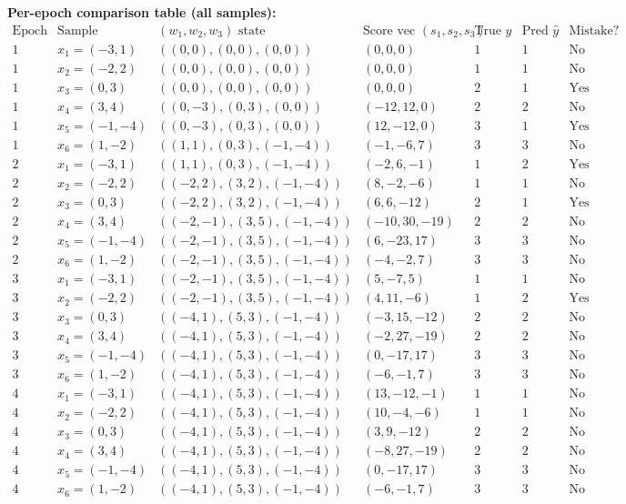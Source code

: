 \documentclass[fleqn]{article}
\begin{document}
    \medskip
    \noindent\textbf{Per-epoch comparison table (all samples):}
    \[
    \begin{array}{c|c|c|c|c|c|c}
        \text{Epoch} & \text{Sample} & (w_1,w_2,w_3)\text{ state} & \text{Score vec }(s_1,s_2,s_3) & \text{True } y & \text{Pred } \hat y & \text{Mistake?}\\
        \hline
        1 & x_1=(-3,1) & ((0,0),(0,0),(0,0)) & (0,0,0) & 1 & 1 & \text{No}\\
        1 & x_2=(-2,2) & ((0,0),(0,0),(0,0)) & (0,0,0) & 1 & 1 & \text{No}\\
        1 & x_3=(0,3) & ((0,0),(0,0),(0,0)) & (0,0,0) & 2 & 1 & \text{Yes}\\
        1 & x_4=(3,4) & ((0,-3),(0,3),(0,0)) & (-12,12,0) & 2 & 2 & \text{No}\\
        1 & x_5=(-1,-4) & ((0,-3),(0,3),(0,0)) & (12,-12,0) & 3 & 1 & \text{Yes}\\
        1 & x_6=(1,-2) & ((1,1),(0,3),(-1,-4)) & (-1,-6,7) & 3 & 3 & \text{No}\\
        \hline
        2 & x_1=(-3,1) & ((1,1),(0,3),(-1,-4)) & (-2,6,-1) & 1 & 2 & \text{Yes}\\
        2 & x_2=(-2,2) & ((-2,2),(3,2),(-1,-4)) & (8,-2,-6) & 1 & 1 & \text{No}\\
        2 & x_3=(0,3) & ((-2,2),(3,2),(-1,-4)) & (6,6,-12) & 2 & 1 & \text{Yes}\\
        2 & x_4=(3,4) & ((-2,-1),(3,5),(-1,-4)) & (-10,30,-19) & 2 & 2 & \text{No}\\
        2 & x_5=(-1,-4) & ((-2,-1),(3,5),(-1,-4)) & (6,-23,17) & 3 & 3 & \text{No}\\
        2 & x_6=(1,-2) & ((-2,-1),(3,5),(-1,-4)) & (-4,-2,7) & 3 & 3 & \text{No}\\
        \hline
        3 & x_1=(-3,1) & ((-2,-1),(3,5),(-1,-4)) & (5,-7,5) & 1 & 1 & \text{No}\\
        3 & x_2=(-2,2) & ((-2,-1),(3,5),(-1,-4)) & (4,11,-6) & 1 & 2 & \text{Yes}\\
        3 & x_3=(0,3) & ((-4,1),(5,3),(-1,-4)) & (-3,15,-12) & 2 & 2 & \text{No}\\
        3 & x_4=(3,4) & ((-4,1),(5,3),(-1,-4)) & (-2,27,-19) & 2 & 2 & \text{No}\\
        3 & x_5=(-1,-4) & ((-4,1),(5,3),(-1,-4)) & (0,-17,17) & 3 & 3 & \text{No}\\
        3 & x_6=(1,-2) & ((-4,1),(5,3),(-1,-4)) & (-6,-1,7) & 3 & 3 & \text{No}\\
        \hline
        4 & x_1=(-3,1) & ((-4,1),(5,3),(-1,-4)) & (13,-12,-1) & 1 & 1 & \text{No}\\
        4 & x_2=(-2,2) & ((-4,1),(5,3),(-1,-4)) & (10,-4,-6) & 1 & 1 & \text{No}\\
        4 & x_3=(0,3) & ((-4,1),(5,3),(-1,-4)) & (3,9,-12) & 2 & 2 & \text{No}\\
        4 & x_4=(3,4) & ((-4,1),(5,3),(-1,-4)) & (-8,27,-19) & 2 & 2 & \text{No}\\
        4 & x_5=(-1,-4) & ((-4,1),(5,3),(-1,-4)) & (0,-17,17) & 3 & 3 & \text{No}\\
        4 & x_6=(1,-2) & ((-4,1),(5,3),(-1,-4)) & (-6,-1,7) & 3 & 3 & \text{No}
    \end{array}
    \]
\end{document}

